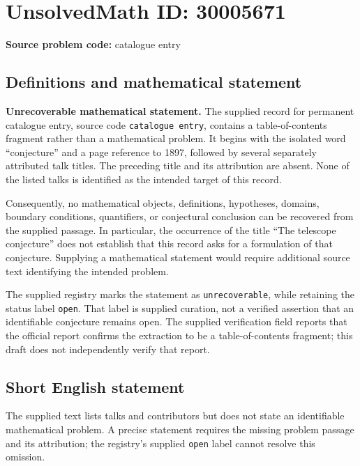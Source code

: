 \documentclass[11pt]{article}
\begin{document}
\section*{UnsolvedMath ID: 30005671}
\textbf{Source problem code:} catalogue entry
\subsection{Definitions and mathematical statement}
\textbf{Unrecoverable mathematical statement.} The supplied record for permanent catalogue entry, source code \texttt{catalogue entry}, contains a table-of-contents fragment rather than a mathematical problem. It begins with the isolated word ``conjecture'' and a page reference to 1897, followed by several separately attributed talk titles. The preceding title and its attribution are absent. None of the listed talks is identified as the intended target of this record.

Consequently, no mathematical objects, definitions, hypotheses, domains, boundary conditions, quantifiers, or conjectural conclusion can be recovered from the supplied passage. In particular, the occurrence of the title ``The telescope conjecture'' does not establish that this record asks for a formulation of that conjecture. Supplying a mathematical statement would require additional source text identifying the intended problem.

The supplied registry marks the statement as \texttt{unrecoverable}, while retaining the status label \texttt{open}. That label is supplied curation, not a verified assertion that an identifiable conjecture remains open. The supplied verification field reports that the official report confirms the extraction to be a table-of-contents fragment; this draft does not independently verify that report.
\subsection{Short English statement}
The supplied text lists talks and contributors but does not state an identifiable mathematical problem. A precise statement requires the missing problem passage and its attribution; the registry's supplied \texttt{open} label cannot resolve this omission.
\end{document}
